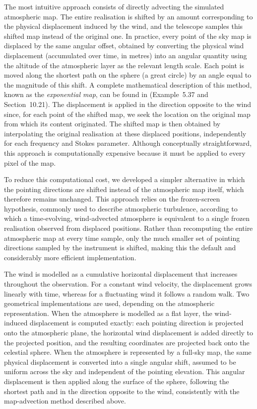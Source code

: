 \documentclass[a4paper,11pt]{article}
\begin{document}
The most intuitive approach consists of directly advecting the simulated atmospheric map. The entire realisation is shifted by an amount corresponding to the physical displacement induced by the wind, and the telescope samples this shifted map instead of the original one. In practice, every point of the sky map is displaced by the same angular offset, obtained by converting the physical wind displacement (accumulated over time, in metres) into an angular quantity using the altitude of the atmospheric layer as the relevant length scale. Each point is moved along the shortest path on the sphere (a great circle) by an angle equal to the magnitude of this shift. A complete mathematical description of this method, known as the \emph{exponential map}, can be found in \cite{boumal2023} (Example~5.37 and Section~10.21). The displacement is applied in the direction opposite to the wind since, for each point of the shifted map, we seek the location on the original map from which its content originated. The shifted map is then obtained by interpolating the original realisation at these displaced positions, independently for each frequency and Stokes parameter. Although conceptually straightforward, this approach is computationally expensive because it must be applied to every pixel of the map.

To reduce this computational cost, we developed a simpler alternative in which the pointing directions are shifted instead of the atmospheric map itself, which therefore remains unchanged. This approach relies on the frozen-screen hypothesis, commonly used to describe atmospheric turbulence, according to which a time-evolving, wind-advected atmosphere is equivalent to a single frozen realisation observed from displaced positions. Rather than recomputing the entire atmospheric map at every time sample, only the much smaller set of pointing directions sampled by the instrument is shifted, making this the default and considerably more efficient implementation.

The wind is modelled as a cumulative horizontal displacement that increases throughout the observation. For a constant wind velocity, the displacement grows linearly with time, whereas for a fluctuating wind it follows a random walk. Two geometrical implementations are used, depending on the atmospheric representation. When the atmosphere is modelled as a flat layer, the wind-induced displacement is computed exactly: each pointing direction is projected onto the atmospheric plane, the horizontal wind displacement is added directly to the projected position, and the resulting coordinates are projected back onto the celestial sphere. When the atmosphere is represented by a full-sky map, the same physical displacement is converted into a single angular shift, assumed to be uniform across the sky and independent of the pointing elevation. This angular displacement is then applied along the surface of the sphere, following the shortest path and in the direction opposite to the wind, consistently with the map-advection method described above.
\end{document}
